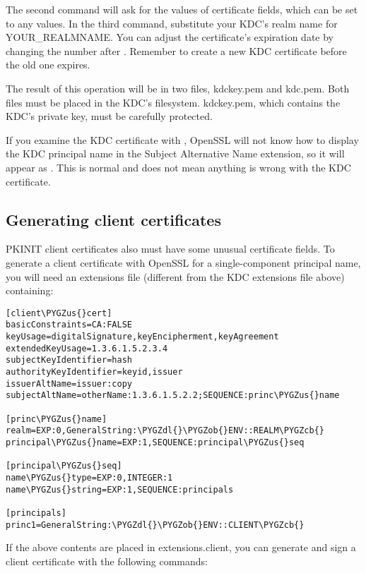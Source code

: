 \documentclass[letterpaper,10pt,english]{sphinxmanual}
\def\PYGZus{\char`\_}
\def\PYGZob{\char`\{}
\def\PYGZcb{\char`\}}
\def\PYGZdl{\char`\$}
\begin{document}
The second command will ask for the values of certificate fields,
which can be set to any values.  In the third command, substitute your
KDC's realm name for YOUR\_REALMNAME.  You can adjust the certificate's
expiration date by changing the number after .  Remember to
create a new KDC certificate before the old one expires.

The result of this operation will be in two files, kdckey.pem and
kdc.pem.  Both files must be placed in the KDC's filesystem.
kdckey.pem, which contains the KDC's private key, must be carefully
protected.

If you examine the KDC certificate with , OpenSSL will not know how to display the KDC principal
name in the Subject Alternative Name extension, so it will appear as
.  This is normal and does not mean
anything is wrong with the KDC certificate.


\subsection{Generating client certificates}
\label{admin/pkinit:generating-client-certificates}
PKINIT client certificates also must have some unusual certificate
fields.  To generate a client certificate with OpenSSL for a
single-component principal name, you will need an extensions file
(different from the KDC extensions file above) containing:

\begin{Verbatim}[commandchars=\\\{\}]
[client\PYGZus{}cert]
basicConstraints=CA:FALSE
keyUsage=digitalSignature,keyEncipherment,keyAgreement
extendedKeyUsage=1.3.6.1.5.2.3.4
subjectKeyIdentifier=hash
authorityKeyIdentifier=keyid,issuer
issuerAltName=issuer:copy
subjectAltName=otherName:1.3.6.1.5.2.2;SEQUENCE:princ\PYGZus{}name

[princ\PYGZus{}name]
realm=EXP:0,GeneralString:\PYGZdl{}\PYGZob{}ENV::REALM\PYGZcb{}
principal\PYGZus{}name=EXP:1,SEQUENCE:principal\PYGZus{}seq

[principal\PYGZus{}seq]
name\PYGZus{}type=EXP:0,INTEGER:1
name\PYGZus{}string=EXP:1,SEQUENCE:principals

[principals]
princ1=GeneralString:\PYGZdl{}\PYGZob{}ENV::CLIENT\PYGZcb{}
\end{Verbatim}

If the above contents are placed in extensions.client, you can
generate and sign a client certificate with the following commands:
\end{document}

